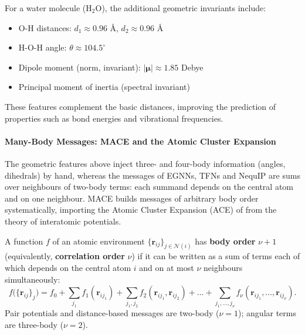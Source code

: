 \begin{example}
For a water molecule (H$_2$O), the additional geometric invariants include:
\begin{itemize}
    \item O-H distances: $d_1 \approx 0.96$ Å, $d_2 \approx 0.96$ Å
    \item H-O-H angle: $\theta \approx 104.5^\circ$
    \item Dipole moment (norm, invariant): $|\boldsymbol{\mu}| \approx 1.85$ Debye
    \item Principal moment of inertia (spectral invariant)
\end{itemize}

These features complement the basic distances, improving the prediction of properties such as bond energies and vibrational frequencies.
\end{example}

\paragraph{Many-Body Messages: MACE and the Atomic Cluster Expansion}

The geometric features above inject three- and four-body information (angles, dihedrals) by hand, whereas the messages of EGNNs, TFNs and NequIP are sums over neighbours of two-body terms: each summand depends on the central atom and on one neighbour. MACE \citep{batatia2022mace} builds messages of arbitrary body order systematically, importing the Atomic Cluster Expansion (ACE) of \citet{drautz2019atomic} from the theory of interatomic potentials.

\begin{definition}\label{def:orden_cuerpo}
A function $f$ of an atomic environment $\{\mathbf{r}_{ij}\}_{j \in \mathcal{N}(i)}$ has \textbf{body order} $\nu + 1$ (equivalently, \textbf{correlation order} $\nu$) if it can be written as a sum of terms each of which depends on the central atom $i$ and on at most $\nu$ neighbours simultaneously:
\[f\big(\{\mathbf{r}_{ij}\}_j\big) = f_0 + \sum_{j_1} f_1(\mathbf{r}_{ij_1}) + \sum_{j_1, j_2} f_2(\mathbf{r}_{ij_1}, \mathbf{r}_{ij_2}) + \dots + \sum_{j_1, \dots, j_\nu} f_\nu(\mathbf{r}_{ij_1}, \dots, \mathbf{r}_{ij_\nu}).\]
Pair potentials and distance-based messages are two-body ($\nu = 1$); angular terms are three-body ($\nu = 2$).
\end{definition}

